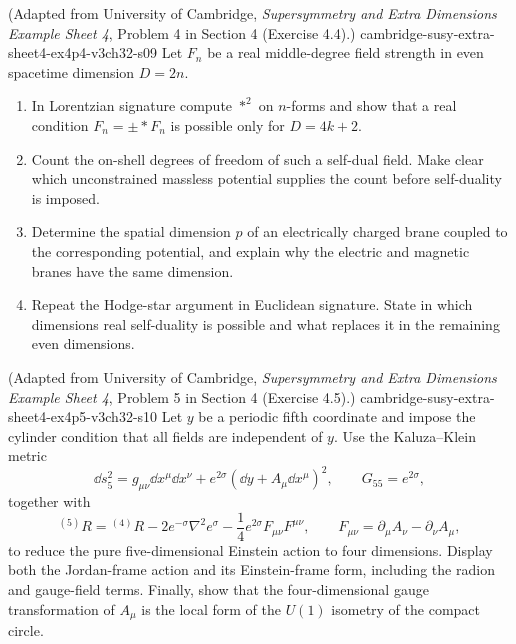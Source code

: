 \begin{enumerate}
    {(Adapted from University of Cambridge, \emph{Supersymmetry and Extra
      Dimensions Example Sheet 4}, Problem 4 in Section 4 (Exercise 4.4).)}
    {cambridge-susy-extra-sheet4-ex4p4-v3ch32-s09}
  Let \(F_n\) be a real middle-degree field strength in even spacetime
  dimension \(D=2n\).
  \begin{enumerate}
    \item In Lorentzian signature compute \(*^2\) on \(n\)-forms and show
      that a real condition \(F_n=\pm *F_n\) is possible only for
      \(D=4k+2\).
    \item Count the on-shell degrees of freedom of such a self-dual field.
      Make clear which unconstrained massless potential supplies the count
      before self-duality is imposed.
    \item Determine the spatial dimension \(p\) of an electrically charged
      brane coupled to the corresponding potential, and explain why the
      electric and magnetic branes have the same dimension.
    \item Repeat the Hodge-star argument in Euclidean signature.  State in
      which dimensions real self-duality is possible and what replaces it
      in the remaining even dimensions.
  \end{enumerate}

    {(Adapted from University of Cambridge, \emph{Supersymmetry and Extra
      Dimensions Example Sheet 4}, Problem 5 in Section 4 (Exercise 4.5).)}
    {cambridge-susy-extra-sheet4-ex4p5-v3ch32-s10}
  Let \(y\) be a periodic fifth coordinate and impose the cylinder condition
  that all fields are independent of \(y\).  Use the Kaluza--Klein metric
  \[
    \dd s_5^2=g_{\mu\nu}\dd x^\mu \dd x^\nu
      +e^{2\sigma}(\dd y+A_\mu \dd x^\mu)^2,
    \qquad G_{55}=e^{2\sigma},
  \]
  together with
  \[
    {}^{(5)}R={}^{(4)}R-2e^{-\sigma}\nabla^2e^\sigma
      -\frac14e^{2\sigma}F_{\mu\nu}F^{\mu\nu},
    \qquad F_{\mu\nu}=\partial_\mu A_\nu-\partial_\nu A_\mu,
  \]
  to reduce the pure five-dimensional Einstein action to four dimensions.
  Display both the Jordan-frame action and its Einstein-frame form,
  including the radion and gauge-field terms.  Finally, show that the
  four-dimensional gauge transformation of \(A_\mu\) is the local form of
  the \(U(1)\) isometry of the compact circle.


\end{enumerate}

